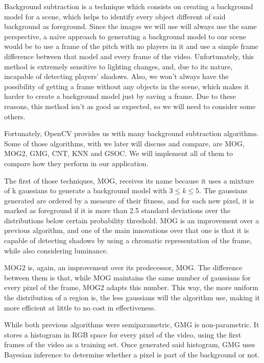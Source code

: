 Background subtraction is a technique which consists on creating a background model for a scene, which helps to identify every object different of said background as foreground. Since the images we will use will always use the same perspective, a naïve approach to generating a background model to our scene would be to use a frame of the pitch with no players in it and use a simple frame difference between that model and every frame of the video. Unfortunately, this method is extremely sensitive to lighting changes, and, due to its nature, incapable of detecting players’ shadows. Also, we won't always have the possibility of getting a frame without any objects in the scene, which makes it harder to create a background model just by saving a frame. Due to these reasons, this method isn’t as good as expected, so we will need to consider some others.

Fortunately, OpenCV provides us with many background subtraction algorithms. Some of those algorithms, with we later will discuss and compare, are MOG, MOG2, GMG, CNT, KNN and GSOC. We will implement all of them to compare how they perform in our application.

The first of those techniques, MOG, receives its name because it uses a mixture of k gaussians to generate a background model with $3 \leq k \leq 5$. The gaussians generated are ordered by a measure of their fitness, and for each new pixel, it is marked as foreground if it is more than 2.5 standard deviations over the distributions below certain probability threshold. MOG is an improvement over a previous algorithm, and one of the main innovations over that one is that it is capable of detecting shadows by using a chromatic representation of the frame, while also considering luminance.

MOG2 is, again, an improvement over its predecessor, MOG. The difference between them is that, while MOG maintains the same number of gaussians for every pixel of the frame, MOG2 adapts this number. This way, the more uniform the distribution of a region is, the less gaussians will the algorithm use, making it more efficient at little to no cost in effectiveness.

While both previous algorithms were semiparametric, GMG is non-parametric. It stores a histogram in RGB space for every pixel of the video, using the first frames of the video as a training set. Once generated said histogram, GMG uses Bayesian inference to determine whether a pixel is part of the background or not.

